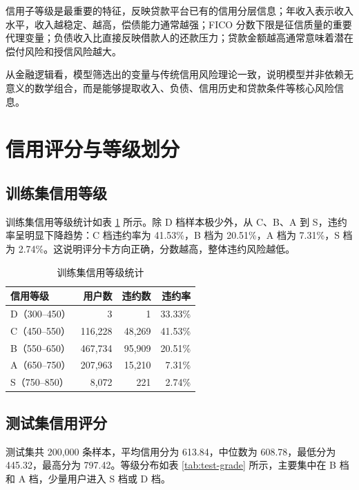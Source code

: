 \documentclass[UTF8,a4paper,12pt]{ctexart}
\begin{document}
信用子等级是最重要的特征，反映贷款平台已有的信用分层信息；年收入表示收入水平，收入越稳定、越高，偿债能力通常越强；FICO 分数下限是征信质量的重要代理变量；负债收入比直接反映借款人的还款压力；贷款金额越高通常意味着潜在偿付风险和授信风险越大。

从金融逻辑看，模型筛选出的变量与传统信用风险理论一致，说明模型并非依赖无意义的数学组合，而是能够提取收入、负债、信用历史和贷款条件等核心风险信息。

\section{信用评分与等级划分}

\subsection{训练集信用等级}

训练集信用等级统计如表 \ref{tab:train-grade} 所示。除 D 档样本极少外，从 C、B、A 到 S，违约率呈明显下降趋势：C 档违约率为 41.53\%，B 档为 20.51\%，A 档为 7.31\%，S 档为 2.74\%。这说明评分卡方向正确，分数越高，整体违约风险越低。

\begin{table}[H]
    \centering
    \caption{训练集信用等级统计}
    \label{tab:train-grade}
    \begin{tabular}{lrrr}
        \toprule
        信用等级 & 用户数 & 违约数 & 违约率 \\
        \midrule
        D（300--450） & 3 & 1 & 33.33\% \\
        C（450--550） & 116,228 & 48,269 & 41.53\% \\
        B（550--650） & 467,734 & 95,909 & 20.51\% \\
        A（650--750） & 207,963 & 15,210 & 7.31\% \\
        S（750--850） & 8,072 & 221 & 2.74\% \\
        \bottomrule
    \end{tabular}
\end{table}

\subsection{测试集信用评分}

测试集共 200,000 条样本，平均信用分为 613.84，中位数为 608.78，最低分为 445.32，最高分为 797.42。等级分布如表 \ref{tab:test-grade} 所示，主要集中在 B 档和 A 档，少量用户进入 S 档或 D 档。
\end{document}
